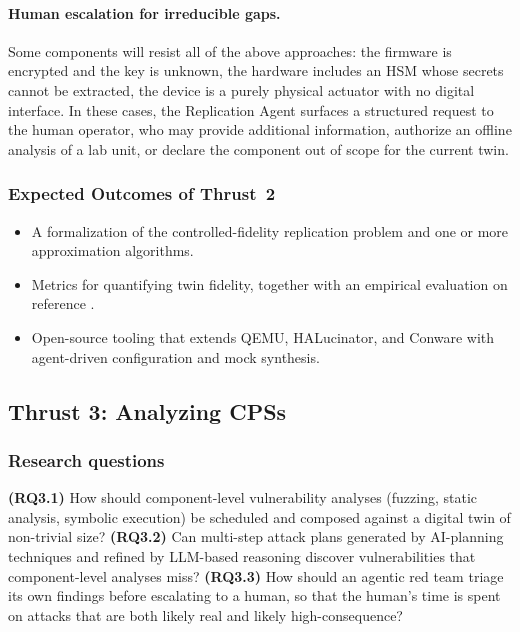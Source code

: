 \paragraph{Human escalation for irreducible gaps.}
Some components will resist all of the above approaches: the firmware
is encrypted and the key is unknown, the hardware includes an HSM
whose secrets cannot be extracted, the device is a purely physical
actuator with no digital interface. In these cases, the Replication
Agent surfaces a structured request to the human operator, who may
provide additional information, authorize an offline analysis of a
lab unit, or declare the component out of scope for the current twin.

\subsubsection{Expected Outcomes of Thrust~2}
\begin{itemize}[leftmargin=1.3em,itemsep=0.1em,topsep=0.2em]
  \item A formalization of the controlled-fidelity replication problem
  and one or more approximation algorithms.
  \item Metrics for quantifying twin fidelity, together with an
  empirical evaluation on reference \CPSs.
  \item Open-source tooling that extends QEMU, HALucinator, and
  Conware with agent-driven configuration and mock synthesis.
\end{itemize}

\subsection{Thrust 3: Analyzing CPSs}
\label{sec:thrust3}

\subsubsection*{Research questions}
\textbf{(RQ3.1)} How should component-level vulnerability analyses
(fuzzing, static analysis, symbolic execution) be scheduled and
composed against a digital twin of non-trivial size?
\textbf{(RQ3.2)} Can multi-step attack plans generated by AI-planning
techniques and refined by LLM-based reasoning discover vulnerabilities
that component-level analyses miss?
\textbf{(RQ3.3)} How should an agentic red team triage its own
findings before escalating to a human, so that the human's time is
spent on attacks that are both likely real and likely
high-consequence?

